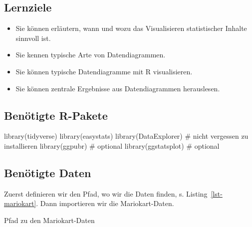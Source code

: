 \documentclass[
  a4paper,
]{scrbook}
\newenvironment{Shaded}{\begin{snugshade}}{\end{snugshade}}
\newcommand{\CommentTok}[1]{\textcolor[rgb]{0.37,0.37,0.37}{#1}}
\newcommand{\FunctionTok}[1]{\textcolor[rgb]{0.28,0.35,0.67}{#1}}
\newcommand{\NormalTok}[1]{\textcolor[rgb]{0.00,0.23,0.31}{#1}}
\newcommand{\OtherTok}[1]{\textcolor[rgb]{0.00,0.23,0.31}{#1}}
\newcommand{\StringTok}[1]{\textcolor[rgb]{0.13,0.47,0.30}{#1}}
\providecommand{\tightlist}{%
  \setlength{\itemsep}{0pt}\setlength{\parskip}{0pt}}\usepackage{longtable,booktabs,array}
\theoremstyle{definition}
\theoremstyle{definition}
\theoremstyle{definition}
\theoremstyle{remark}
\begin{document}
\subsection{Lernziele}\label{lernziele-4}

\begin{itemize}
\tightlist
\item
  Sie können erläutern, wann und wozu das Visualisieren statistischer
  Inhalte sinnvoll ist.
\item
  Sie kennen typische Arte von Datendiagrammen.
\item
  Sie können typische Datendiagramme mit R visualisieren.
\item
  Sie können zentrale Ergebnisse aus Datendiagrammen herauslesen.
\end{itemize}

\subsection{Benötigte R-Pakete}\label{benuxf6tigte-r-pakete-1}

\begin{Shaded}
\begin{Highlighting}[]
\FunctionTok{library}\NormalTok{(tidyverse)}
\FunctionTok{library}\NormalTok{(easystats)}
\FunctionTok{library}\NormalTok{(DataExplorer)  }\CommentTok{\# nicht vergessen zu installieren}
\FunctionTok{library}\NormalTok{(ggpubr)  }\CommentTok{\# optional}
\FunctionTok{library}\NormalTok{(ggstatsplot)  }\CommentTok{\# optional}
\end{Highlighting}
\end{Shaded}

\subsection{Benötigte Daten}\label{benuxf6tigte-daten-2}

Zuerst definieren wir den Pfad, wo wir die Daten finden, s.
Listing~\ref{lst-mariokart}. Dann importieren wir die Mariokart-Daten.

\begin{codelisting}

\caption{\label{lst-mariokart}Pfad zu den Mariokart-Daten}

\centering{

\begin{Shaded}
\begin{Highlighting}[]
\NormalTok{mariokart\_path }\OtherTok{\textless{}{-}} \FunctionTok{paste0}\NormalTok{(}
  \StringTok{"https://vincentarelbundock.github.io/Rdatasets"}\NormalTok{,}
  \StringTok{"/csv/openintro/mariokart.csv"}\NormalTok{)}

\NormalTok{mariokart }\OtherTok{\textless{}{-}} \FunctionTok{read.csv}\NormalTok{(mariokart\_path)}
\end{Highlighting}
\end{Shaded}

}

\end{codelisting}%
\end{document}
